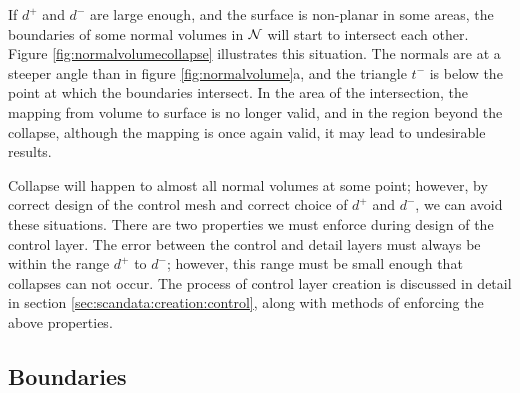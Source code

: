 If $d^+$ and $d^-$ are large enough, and the surface is non-planar in some areas, the boundaries of some normal volumes in ${\cal N}$ will start to intersect each other. Figure \ref{fig:normalvolumecollapse} illustrates this situation. The normals are at a steeper angle than in figure \ref{fig:normalvolume}a, and the triangle $t^-$ is below the point at which the boundaries intersect. In the area of the intersection, the mapping from volume to surface is no longer valid, and in the region beyond the collapse, although the mapping is once again valid, it may lead to undesirable results.

Collapse will happen to almost all normal volumes at some point; however, by correct design of the control mesh and correct choice of $d^+$ and $d^-$, we can avoid these situations. There are two properties we must enforce during design of the control layer. The error between the control and detail layers must always be within the range $d^+$ to $d^-$; however, this range must be small enough that collapses can not occur. The process of control layer creation is discussed in detail in section \ref{sec:scandata:creation:control}, along with methods of enforcing the above properties.

\subsection{\label{sec:scandata:normalvolume:boundaries}Boundaries}

